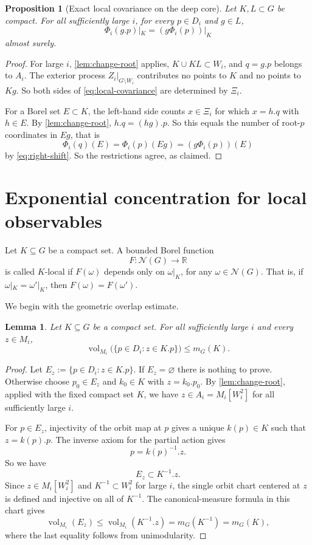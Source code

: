 \documentclass[12pt]{amsart}
\newtheorem{proposition}[proposition]{Proposition}
\newtheorem{lemma}[lemma]{Lemma}
\theoremstyle{definition}
\newcommand{\Haar}{m_G}
\newcommand{\vol}{\operatorname{vol}}
\newcommand{\cN}{\mathcal N}
\newcommand{\1}{\mathbf 1}
\begin{document}
\begin{proposition}[Exact local covariance on the deep core]\label{prop:local-covariance}
Let $K,L\subset G$ be compact. For all sufficiently large $i$, for every $p\in D_i$ and $g\in L$,
\begin{equation}\label{eq:local-covariance}
 \Phi_i(g.p)|_K=(g\Phi_i(p))|_K
\end{equation}
almost surely.
\end{proposition}

\begin{proof}
For large $i$, \cref{lem:change-root} applies, $K\cup KL\subset W_i$, and $q=g.p$ belongs to $A_i$. The exterior process $Z_i|_{G\setminus W_i}$ contributes no points to $K$ and no points to $Kg$. So both sides of \eqref{eq:local-covariance} are determined by $\Xi_i$.

For a Borel set $E\subset K$, the left-hand side counts $x\in\Xi_i$ for which $x=h.q$ with $h\in E$. By \cref{lem:change-root}, $h.q=(hg).p$. So this equals the number of root-$p$ coordinates in $Eg$, that is
\[
 \Phi_i(q)(E)=\Phi_i(p)(Eg)=(g\Phi_i(p))(E)
\]
by \eqref{eq:right-shift}. So the restrictions agree, as claimed.
\end{proof}

\section{Exponential concentration for local observables}

Let $K \subseteq G$ be a compact set. A bounded Borel function
\[
F : \cN(G) \to \mathbb{R}
\]
is called $K$-local if $F(\omega)$ depends only on $\omega|_K$, for any $\omega\in \cN(G)$. That is, if
$\omega|_K = \omega'|_K$,
then
$F(\omega) = F(\omega')$.


We begin with the geometric overlap estimate.

\begin{lemma}\label{lem:overlap}
Let $K \subseteq G$ be a compact set. For all sufficiently large $i$ and every $z\in M_i$,
\begin{equation}\label{eq:overlap}
 \vol_{M_i}\bigl(\{p\in D_i:z\in K.p\}\bigr)\leq \Haar(K).
\end{equation}
\end{lemma}

\begin{proof}
Let $E_z:=\{p\in D_i:z\in K.p\}$. If $E_z=\varnothing$ there is nothing to prove. Otherwise choose $p_0\in E_z$ and $k_0\in K$ with $z=k_0.p_0$. By \cref{lem:change-root}, applied with the fixed compact set $K$, we have $z\in A_i=M_i[W_i^2]$ for all sufficiently large $i$.

For $p\in E_z$, injectivity of the orbit map at $p$ gives a unique $k(p)\in K$ such that $z=k(p).p$. The inverse axiom for the partial action gives
\[
 p=k(p)^{-1}.z.
\]
So we have
\[
 E_z\subset K^{-1}.z.
\]
Since $z\in M_i[W_i^2]$ and $K^{-1}\subset W_i^2$ for large $i$, the single orbit chart centered at $z$ is defined and injective on all of $K^{-1}$. The canonical-measure formula in this chart gives
\[
 \vol_{M_i}(E_z)\leq \vol_{M_i}(K^{-1}.z)
 =\Haar(K^{-1})=\Haar(K),
\]
where the last equality follows from unimodularity.
\end{proof}
\end{document}
